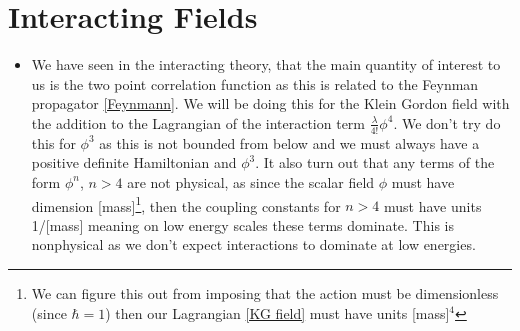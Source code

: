 \documentclass[11pt]{article}
\numberwithin{equation}{section}
\begin{document}


\newpage
\section{Interacting Fields} %
\label{interacting_fields}
\begin{itemize}
  \item We have seen in the interacting theory, that the main quantity of interest to us is the two point correlation function as this is related to the Feynman propagator \ref{Feynmann}. We will be doing this for the Klein Gordon field with the addition to the Lagrangian of the interaction term $\frac{\lambda}{4!}\phi^4$. We don't try do this for $\phi^3$ as this is not bounded from below and we must always have a positive definite Hamiltonian and $\phi^3$. It also turn out that any terms of the form $\phi^n$, $n>4$ are not physical, as since the scalar field $\phi$ must have dimension [mass]\footnote{We can figure this out from imposing that the action must be dimensionless (since $\hbar=1$) then our Lagrangian \ref{KG field} must have units [mass]$^4$}, then the coupling constants for $n>4$ must have units 1/[mass] meaning on low energy scales these terms dominate. This is nonphysical as we don't expect interactions to dominate at low energies.  
\end{itemize}
\end{document}
